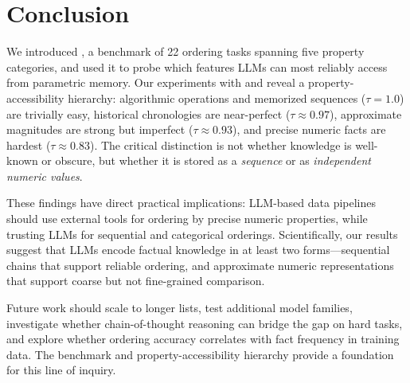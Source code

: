 \section{Conclusion}
\label{sec:conclusion}

We introduced \benchname, a benchmark of 22 ordering tasks spanning five property categories, and used it to probe which features LLMs can most reliably access from parametric memory.
Our experiments with \gptlarge and \gptsmall reveal a property-accessibility hierarchy: algorithmic operations and memorized sequences ($\tau = 1.0$) are trivially easy, historical chronologies are near-perfect ($\tau \approx 0.97$), approximate magnitudes are strong but imperfect ($\tau \approx 0.93$), and precise numeric facts are hardest ($\tau \approx 0.83$).
The critical distinction is not whether knowledge is well-known or obscure, but whether it is stored as a \emph{sequence} or as \emph{independent numeric values}.

These findings have direct practical implications: LLM-based data pipelines should use external tools for ordering by precise numeric properties, while trusting LLMs for sequential and categorical orderings.
Scientifically, our results suggest that LLMs encode factual knowledge in at least two forms---sequential chains that support reliable ordering, and approximate numeric representations that support coarse but not fine-grained comparison.

Future work should scale to longer lists, test additional model families, investigate whether chain-of-thought reasoning can bridge the gap on hard tasks, and explore whether ordering accuracy correlates with fact frequency in training data.
The \benchname benchmark and property-accessibility hierarchy provide a foundation for this line of inquiry.
